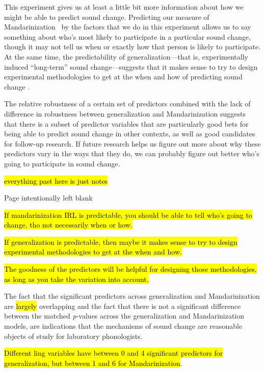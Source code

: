 This experiment gives us at least a little bit more information about how we might be able to predict sound change. Predicting our measure of Mandarinization \IRL~by the factors that we do in this experiment allows us to say something about who's most likely to participate in a particular sound change, though it may not tell us when or exactly how that person is likely to participate. At the same time, the predictability of generalization---that is, experimentally induced ``long-term'' sound change---suggests that it makes sense to try to design experimental methodologies to get at the when and how of predicting sound change \IRL.

The relative robustness of a certain set of predictors combined with the lack of difference in robustness between generalization and Mandarinization suggests that there is a subset of predictor variables that are particularly good bets for being able to predict sound change in other contexts, as well as good candidates for follow-up research. If future research helps us figure out more about why these predictors vary in the ways that they do, we can probably figure out better who's going to participate in sound change.

\hl{everything past here is just notes}

\pagebreak

Page intentionally left blank

\pagebreak


\hl{If mandarinization IRL is predictable, you should be able to tell who's going to change, tho not necessarily when or how.}

\hl{If generalization is predictable, then maybe it makes sense to try to design experimental methodologies to get at the when and how.}

\hl{The goodness of the predictors will be helpful for designing those methodologies, as long as you take the variation into account.}

The fact that the significant predictors across generalization and Mandarinization are \hl{largely} overlapping and the fact that there is not a significant difference between the matched \textit{p}-values across the generalization and Mandarinization models, are indications that the mechanisms of sound change are reasonable objects of study for laboratory phonologists.

\hl{Different ling variables have between 0 and 4 significant predictors for generalization, but between 1 and 6 for Mandarinization}.

